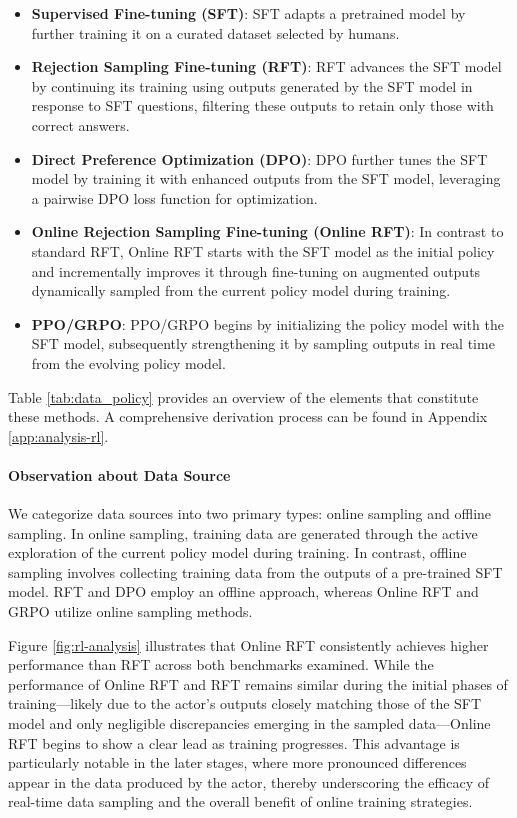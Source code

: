 \begin{itemize}[topsep=0pt]
\begin{itemize}[topsep=0pt]
\begin{itemize}
    \item  \textbf{Supervised Fine-tuning (SFT)}: SFT adapts a pretrained model by further training it on a curated dataset selected by humans.
    \item \textbf{Rejection Sampling Fine-tuning (RFT)}: RFT advances the SFT model by continuing its training using outputs generated by the SFT model in response to SFT questions, filtering these outputs to retain only those with correct answers.
    \item \textbf{Direct Preference Optimization (DPO)}: DPO further tunes the SFT model by training it with enhanced outputs from the SFT model, leveraging a pairwise DPO loss function for optimization.
    \item \textbf{Online Rejection Sampling Fine-tuning (Online RFT)}: In contrast to standard RFT, Online RFT starts with the SFT model as the initial policy and incrementally improves it through fine-tuning on augmented outputs dynamically sampled from the current policy model during training.
    \item \textbf{PPO/GRPO}: PPO/GRPO begins by initializing the policy model with the SFT model, subsequently strengthening it by sampling outputs in real time from the evolving policy model.
\end{itemize}

Table \ref{tab:data_policy} provides an overview of the elements that constitute these methods. A comprehensive derivation process can be found in Appendix \ref{app:analysis-rl}.

\paragraph{Observation about Data Source} We categorize data sources into two primary types: online sampling and offline sampling. In online sampling, training data are generated through the active exploration of the current policy model during training. In contrast, offline sampling involves collecting training data from the outputs of a pre-trained SFT model. RFT and DPO employ an offline approach, whereas Online RFT and GRPO utilize online sampling methods.

Figure \ref{fig:rl-analysis} illustrates that Online RFT consistently achieves higher performance than RFT across both benchmarks examined. While the performance of Online RFT and RFT remains similar during the initial phases of training—likely due to the actor's outputs closely matching those of the SFT model and only negligible discrepancies emerging in the sampled data—Online RFT begins to show a clear lead as training progresses. This advantage is particularly notable in the later stages, where more pronounced differences appear in the data produced by the actor, thereby underscoring the efficacy of real-time data sampling and the overall benefit of online training strategies.


\end{itemize}
\end{itemize}
